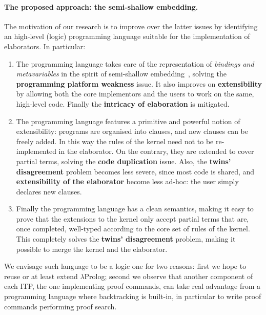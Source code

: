 \documentclass{easychair}
\begin{document}
\paragraph{The proposed approach: the semi-shallow embedding.}

The motivation of our research is to improve over the latter issues by
identifying an high-level (logic) programming language suitable for
the implementation of elaborators. In particular:
\begin{enumerate}
\item The programming language takes care of the representation of
	\emph{bindings and metavariables} in the spirit of semi-shallow embedding~\cite{holsuperlight},
	solving the \textbf{programming platform weakness} issue.
	It also improves on \textbf{extensibility} by allowing
	both the core implementors and the users to work on the same,
	high-level code.
	Finally the \textbf{intricacy of elaboration} is mitigated.
\item The programming language features a primitive and powerful
	notion of extensibility: programs are organised into clauses,
	and new clauses can be freely added.
	In this way the rules of the kernel need not to be re-implemented in the
	elaborator. On the contrary, they are extended to cover partial terms,
	solving the \textbf{code duplication} issue.
	Also, the \textbf{twins' disagreement} problem becomes less severe,
	since most code is shared, and
	\textbf{extensibility of the elaborator}
	become less ad-hoc: the user simply declares new clauses.
\item Finally the programming language has a clean semantics, making it
	easy to prove that the extensions to the kernel
	only accept partial terms that are, once completed,
	well-typed according
	to the core set of rules of the kernel.  This completely
	solves the \textbf{twins' disagreement} problem, making it possible to
	merge the kernel and the elaborator.
\end{enumerate}

We envisage such language to be a logic one for two reasons:
first we hope to reuse or at least extend $\lambda$Prolog;
second we observe that another component of each ITP, the one
implementing proof commands, can take real advantage from a 
programming language where backtracking is built-in, in
particular to write proof commands performing proof search.
\end{document}
